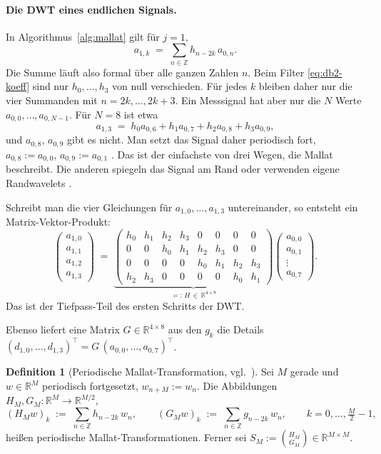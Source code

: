 \documentclass[a4paper,11pt,bibliography=totoc,listof=totoc,headinclude=true,cleardoublepage=empty,oneside]{scrbook}
\theoremstyle{plain}
\theoremstyle{definition}
\newtheorem{Definition}[Satz]{Definition}
\newcommand{\R}{\mathbb{R}}
\newcommand{\Z}{\mathbb{Z}}
\begin{document}
\paragraph{Die DWT eines endlichen Signals.}
In Algorithmus~\ref{alg:mallat} gilt für $j = 1$, 
\[
  a_{1,k} \;=\; \sum_{n\in\Z} h_{n-2k}\,a_{0,n} .
\]
Die Summe läuft also formal über alle ganzen Zahlen $n$. Beim Filter
\eqref{eq:db2-koeff} sind nur $h_0,\dots,h_3$ von null verschieden. Für jedes
$k$ bleiben daher nur die vier Summanden mit $n = 2k,\dots,2k+3$. Ein
Messsignal hat aber nur die $N$ Werte $a_{0,0},\dots,a_{0,N-1}$. Für $N=8$ ist
etwa
\[
  a_{1,3} \;=\; h_0a_{0,6} + h_1a_{0,7} + h_2a_{0,8} + h_3a_{0,9},
\]
und $a_{0,8}$, $a_{0,9}$ gibt es nicht. Man setzt das Signal daher periodisch
fort, $a_{0,8} := a_{0,0}$, $a_{0,9} := a_{0,1}$ \cite[Kap.~2.4.7.2]{lmr}. %
Das ist der einfachste von drei Wegen, die Mallat beschreibt. Die anderen
spiegeln das Signal am Rand oder verwenden eigene Randwavelets
\cite[Kap.~7.3.1, 7.5]{mallat}. %
 
Schreibt man die vier Gleichungen für $a_{1,0},\dots,a_{1,3}$ untereinander,
so entsteht ein Matrix-Vektor-Produkt:
\[
  \begin{pmatrix} a_{1,0}\\ a_{1,1}\\ a_{1,2}\\ a_{1,3} \end{pmatrix}
  \;=\;
  \underbrace{\begin{pmatrix}
    h_0 & h_1 & h_2 & h_3 & 0 & 0 & 0 & 0\\
    0 & 0 & h_0 & h_1 & h_2 & h_3 & 0 & 0\\
    0 & 0 & 0 & 0 & h_0 & h_1 & h_2 & h_3\\
    h_2 & h_3 & 0 & 0 & 0 & 0 & h_0 & h_1
  \end{pmatrix}}_{=:\,H\,\in\,\R^{4\times 8}}
  \begin{pmatrix} a_{0,0}\\ a_{0,1}\\ \vdots\\ a_{0,7} \end{pmatrix} .
\]
Das ist der Tiefpass-Teil des ersten Schritts der DWT. 

Ebenso liefert eine Matrix $G\in\R^{4\times8}$ aus den $g_k$ die
Details $(d_{1,0},\dots,d_{1,3})^\top = G\,(a_{0,0},\dots,a_{0,7})^\top$.
 
\begin{Definition}[Periodische Mallat-Transformation, vgl.\ {\cite[Kap.~3.6.2]{lmr}}] %
\label{def:periodisch}
Sei $M$ gerade und $w\in\R^M$ periodisch fortgesetzt, $w_{n+M} := w_n$. Die
Abbildungen $H_M, G_M\colon\R^M\to\R^{M/2}$,
\[
  (H_Mw)_k \;:=\; \sum_{n\in\Z} h_{n-2k}\,w_n, \qquad
  (G_Mw)_k \;:=\; \sum_{n\in\Z} g_{n-2k}\,w_n, \qquad k = 0,\dots,\tfrac M2-1,
\]
hei\ss en periodische Mallat-Transformationen. Ferner sei
$S_M := \binom{H_M}{G_M}\in\R^{M\times M}$.
\end{Definition}
\end{document}
